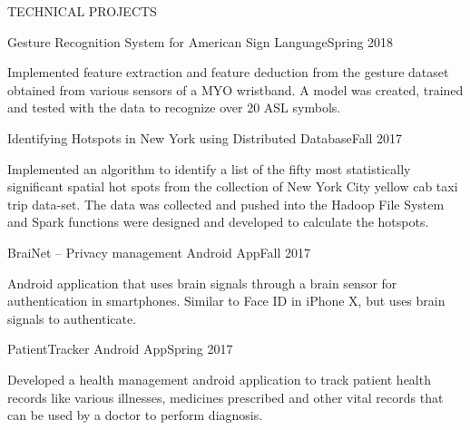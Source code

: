 \documentclass{resume} %
\begin{document}
\begin{rSection}{TECHNICAL PROJECTS} 

\begin{rSubsection}{Gesture Recognition System for American Sign Language}{Spring 2018}{}

\item Implemented feature extraction and feature deduction from the gesture dataset obtained from various sensors of a MYO wristband. A model was created, trained and tested with the data to recognize over 20 ASL symbols.
\end{rSubsection}

\begin{rSubsection}{Identifying Hotspots in New York using Distributed Database}{Fall 2017}{}

\item Implemented an algorithm to identify a list of the fifty most statistically significant spatial hot spots from the collection of New York City yellow cab taxi trip data-set. The data was collected and pushed into the Hadoop File System and Spark functions were designed and developed to calculate the hotspots.
\end{rSubsection}

\begin{rSubsection}{BraiNet – Privacy management Android App}{Fall 2017}{}

\item Android application that uses brain signals through a brain sensor for authentication in smartphones. Similar to Face ID in iPhone X, but uses brain signals to authenticate.
\end{rSubsection}

\begin{rSubsection}{PatientTracker Android App}{Spring 2017}{}

\item Developed a health management android application to track patient health records like various illnesses, medicines prescribed and other vital records that can be used by a doctor to perform diagnosis.
\end{rSubsection}

\end{rSection} 
\end{document}
